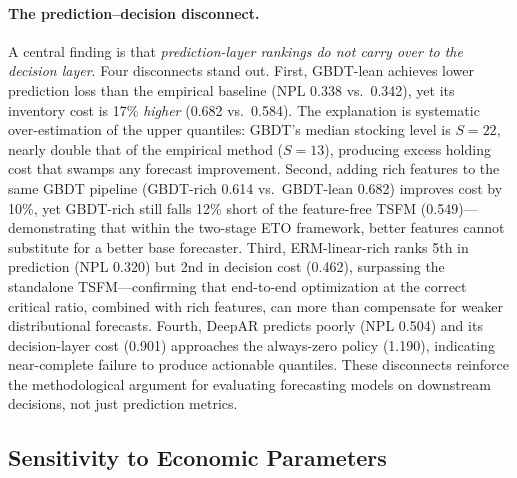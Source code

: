 \documentclass[msom,dblanonrev]{informs4}
\begin{document}
\paragraph{The prediction--decision disconnect.}
A central finding is that \emph{prediction-layer rankings do not carry over to the decision layer}.
Four disconnects stand out.
First, GBDT-lean achieves lower prediction loss than the empirical baseline (NPL 0.338 vs.\ 0.342), yet its inventory cost is 17\% \emph{higher} (0.682 vs.\ 0.584).
The explanation is systematic over-estimation of the upper quantiles: GBDT's median stocking level is $S = 22$, nearly double that of the empirical method ($S = 13$), producing excess holding cost that swamps any forecast improvement.
Second, adding rich features to the same GBDT pipeline (GBDT-rich 0.614 vs.\ GBDT-lean 0.682) improves cost by 10\%, yet GBDT-rich still falls 12\% short of the feature-free TSFM (0.549)---demonstrating that within the two-stage ETO framework, better features cannot substitute for a better base forecaster.
Third, ERM-linear-rich ranks 5th in prediction (NPL 0.320) but 2nd in decision cost (0.462), surpassing the standalone TSFM---confirming that end-to-end optimization at the correct critical ratio, combined with rich features, can more than compensate for weaker distributional forecasts.
Fourth, DeepAR predicts poorly (NPL 0.504) and its decision-layer cost (0.901) approaches the always-zero policy (1.190), indicating near-complete failure to produce actionable quantiles.
These disconnects reinforce the methodological argument for evaluating forecasting models on downstream decisions, not just prediction metrics.

\subsection{Sensitivity to Economic Parameters}\label{sec:sensitivity}
\end{document}

